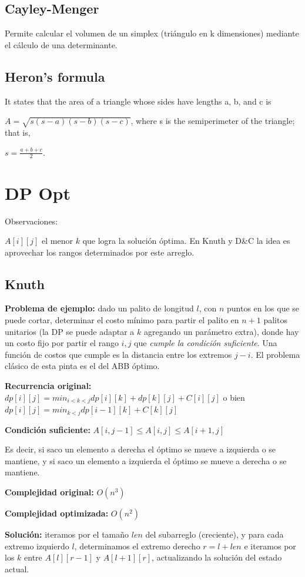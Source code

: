 \subsection{Cayley-Menger}
{
Permite calcular el volumen de un simplex (triángulo en k dimensiones) mediante el cálculo de una determinante.
}

\subsection{Heron's formula}
{
It states that the area of a triangle whose sides have lengths a, b, and c is

\( {\displaystyle A={\sqrt {s(s-a)(s-b)(s-c)}}} \),
where s is the semiperimeter of the triangle; that is,

\( {\displaystyle s={\frac {a+b+c}{2}}} \).
}

\section{DP Opt}
Observaciones:

$A[i][j]$ el menor $k$ que logra la solución óptima. En Knuth y D\&C la idea es aprovechar los rangos
determinados por este arreglo.

\subsection{Knuth}
{
    \textbf{Problema de ejemplo:} dado un palito de longitud $l$, con $n$ puntos en los que se puede cortar,
    determinar el costo mínimo para partir el palito en $n+1$ palitos unitarios (la DP se puede adaptar a $k$ 
    agregando un parámetro extra), donde hay un costo fijo por partir el rango $i, j$ que \emph{cumple la 
    condición suficiente}. Una función de costos que cumple es la distancia entre los extremos $j-i$. 
    El problema clásico de esta pinta es el del ABB óptimo.

    \textbf{Recurrencia original:} $dp[i][j] = min_{i < k < j} {dp[i][k] + dp[k][j]} + C[i][j]$ o bien 
		$dp[i][j] = min_{k < j}{dp[i - 1][k] + C[k][j]}$

    \textbf{Condición suficiente:} $A[i, j - 1] \leq  A[i, j] \leq A[i + 1, j]$

    Es decir, si saco un elemento a derecha el óptimo se mueve a izquierda o se mantiene, y 
    si saco un elemento a izquierda el óptimo se mueve a derecha o se mantiene.

    \textbf{Complejidad original:} $O(n^3)$

    \textbf{Complejidad optimizada:} $O(n^2)$

    \textbf{Solución:} iteramos por el tamaño $len$ del subarreglo (creciente), y para cada extremo izquierdo $l$,
    determinamos el extremo derecho $r=l+len$ e iteramos por los $k$ entre $A[l][r-1]$ y $A[l+1][r]$, actualizando la
    solución del estado actual.

}
